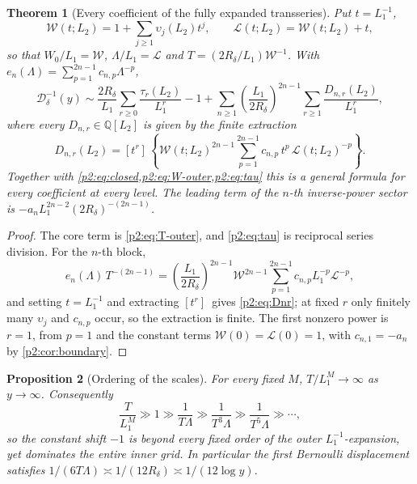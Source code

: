 \documentclass[11pt,a4paper,oneside]{book}
\theoremstyle{plain}
\newtheorem{theorem}{Theorem}[chapter]
\newtheorem{proposition}[theorem]{Proposition}
\theoremstyle{definition}
\theoremstyle{remark}
\newcommand{\Rat}{\mathbb{Q}}
\newcommand{\Coef}[1]{[#1]\,}
\newcommand{\Wlam}{W}
\begin{document}
\begin{theorem}[Every coefficient of the fully expanded transseries]
\label{p2:thm:outer-complete}
Put \(t=L_1^{-1}\),
\begin{equation}
 \mathcal W(t;L_2)=1+\sum_{j\ge1}\upsilon_j(L_2)t^j,
 \qquad
 \mathcal L(t;L_2)=\mathcal W(t;L_2)+t,
 \label{p2:eq:WL-series}
\end{equation}
so that \(\Wlam_0/L_1=\mathcal W\), \(\Lambda/L_1=\mathcal L\) and
\(T=(2R_\delta/L_1)\mathcal W^{-1}\).  With
\(e_n(\Lambda)=\sum_{p=1}^{2n-1}c_{n,p}\Lambda^{-p}\),
\begin{equation}
 \mathcal D_\delta^{-1}(y)
 \sim\frac{2R_\delta}{L_1}\sum_{r\ge0}\frac{\tau_r(L_2)}{L_1^r}-1
 +\sum_{n\ge1}\left(\frac{L_1}{2R_\delta}\right)^{2n-1}
   \sum_{r\ge1}\frac{D_{n,r}(L_2)}{L_1^{r}},
 \label{p2:eq:full-outer}
\end{equation}
where every \(D_{n,r}\in\Rat[L_2]\) is given by the finite extraction
\begin{equation}
 \boxed{\;
 D_{n,r}(L_2)=\Coef{t^r}\left\{
 \mathcal W(t;L_2)^{2n-1}\sum_{p=1}^{2n-1}c_{n,p}\,t^{p}\,
 \mathcal L(t;L_2)^{-p}\right\} . \;}
 \label{p2:eq:Dnr}
\end{equation}
Together with \cref{p2:eq:closed,p2:eq:W-outer,p2:eq:tau} this is a general
formula for every coefficient at every level.  The leading term of the
\(n\)-th inverse-power sector is \(-a_nL_1^{2n-2}(2R_\delta)^{-(2n-1)}\).
\end{theorem}

\begin{proof}
The core term is \cref{p2:eq:T-outer}, and \cref{p2:eq:tau} is reciprocal
series division.  For the \(n\)-th block,
\[
 e_n(\Lambda)\,T^{-(2n-1)}
 =\left(\frac{L_1}{2R_\delta}\right)^{2n-1}\mathcal W^{2n-1}
   \sum_{p=1}^{2n-1}c_{n,p}L_1^{-p}\mathcal L^{-p},
\]
and setting \(t=L_1^{-1}\) and extracting \(\Coef{t^r}\) gives
\cref{p2:eq:Dnr}; at fixed \(r\) only finitely many \(\upsilon_j\) and
\(c_{n,p}\) occur, so the extraction is finite.  The first nonzero power is
\(r=1\), from \(p=1\) and the constant terms \(\mathcal W(0)=\mathcal L(0)=1\),
with \(c_{n,1}=-a_n\) by \cref{p2:cor:boundary}.
\end{proof}

\begin{proposition}[Ordering of the scales]
\label{p2:prop:ordering}
For every fixed \(M\), \(T/L_1^M\to\infty\) as \(y\to\infty\).  Consequently
\begin{equation}
 \frac{T}{L_1^M}\gg 1\gg\frac1{T\Lambda}\gg\frac1{T^3\Lambda}
 \gg\frac1{T^5\Lambda}\gg\cdots,
 \label{p2:eq:ordering}
\end{equation}
so the constant shift \(-1\) is beyond every fixed order of the outer
\(L_1^{-1}\)-expansion, yet dominates the entire inner grid.  In particular the
first Bernoulli displacement satisfies
\(1/(6T\Lambda)\asymp1/(12R_\delta)\asymp1/(12\log y)\).
\end{proposition}
\end{document}
